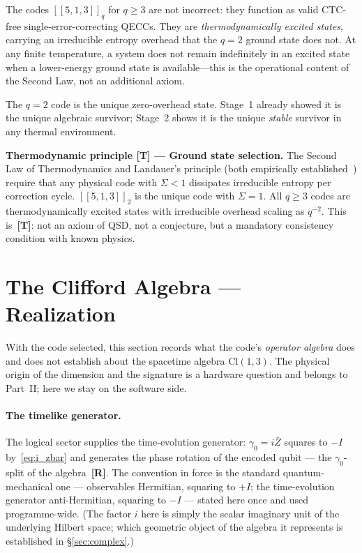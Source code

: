 \documentclass[11pt,a4paper]{article}
\newcommand{\Rmark}{\textcolor{green!50!black}{\textbf{[R]}}}
\newcommand{\Tmark}{\textcolor{orange!70!black}{\textbf{[T]}}}
\newcommand{\Cq}[4]{[\![#1,#2,#3]\!]_{#4}}
\providecommand{\Cl}[1]{\mathrm{Cl}(#1)}
\begin{document}
The codes $\Cq{5}{1}{3}{q}$ for $q\geq3$ are not incorrect: they function as valid CTC-free single-error-correcting QECCs. They are \emph{thermodynamically excited states}, carrying an irreducible entropy overhead that the $q=2$ ground state does not. At any finite temperature, a system does not remain indefinitely in an excited state when a lower-energy ground state is available---this is the operational content of the Second Law, not an additional axiom.

The $q=2$ code is the unique zero-overhead state. Stage~1 already showed it is the unique algebraic survivor; Stage~2 shows it is the unique \emph{stable} survivor in any thermal environment.

\begin{mdframed}[backgroundcolor=Tbg,linecolor=Tcolor,linewidth=1.8pt]
\textbf{Thermodynamic principle [T] --- Ground state selection.}\quad
The Second Law of Thermodynamics and Landauer's principle (both empirically established~\cite{Landauer1961, Berut2012}) require that any physical code with $\Sigma<1$ dissipates irreducible entropy per correction cycle. $\Cq{5}{1}{3}{2}$ is the unique code with $\Sigma=1$. All $q\geq3$ codes are thermodynamically excited states with irreducible overhead scaling as $q^{-2}$. This is~\Tmark: not an axiom of QSD, not a conjecture, but a mandatory consistency condition with known physics.
\end{mdframed}

\section{The Clifford Algebra --- Realization}
\label{sec:bridge}

With the code selected, this section records what the code's \emph{operator algebra} does and does not establish about the spacetime algebra $\Cl{1,3}$. The physical origin of the dimension and the signature is a hardware question and belongs to Part~II; here we stay on the software side.

\paragraph{The timelike generator.} The logical sector supplies the time-evolution generator: $\gamma_0 = i\bar Z$ squares to $-I$ by~\eqref{eq:i_zbar} and generates the phase rotation of the encoded qubit --- the $\gamma_0$-split of the algebra~\Rmark. The convention in force is the standard quantum-mechanical one --- observables Hermitian, squaring to $+I$; the time-evolution generator anti-Hermitian, squaring to $-I$ --- stated here once and used programme-wide. (The factor $i$ here is simply the scalar imaginary unit of the underlying Hilbert space; which geometric object of the algebra it represents is established in \S\ref{sec:complex}.)
\end{document}
